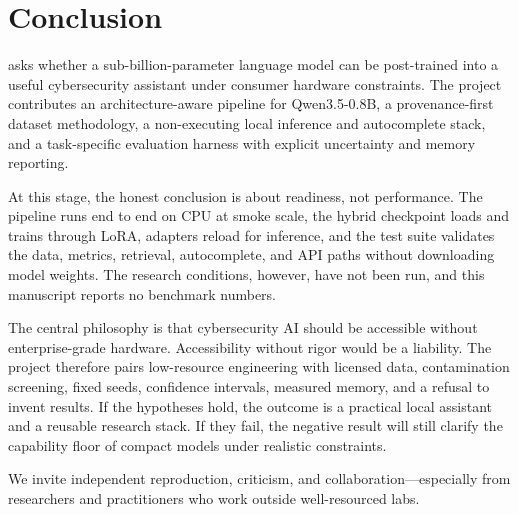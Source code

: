 \section{Conclusion}
\label{sec:conclusion}

\cyberlite{} asks whether a sub-billion-parameter language model can be
post-trained into a useful cybersecurity assistant under consumer hardware
constraints. The project contributes an architecture-aware pipeline for
Qwen3.5-0.8B, a provenance-first dataset methodology, a non-executing local
inference and autocomplete stack, and a task-specific evaluation harness with
explicit uncertainty and memory reporting.

At this stage, the honest conclusion is about readiness, not performance. The
pipeline runs end to end on CPU at smoke scale, the hybrid checkpoint loads and
trains through LoRA, adapters reload for inference, and the test suite validates
the data, metrics, retrieval, autocomplete, and API paths without downloading
model weights. The research conditions, however, have not been run, and this
manuscript reports no benchmark numbers.

The central philosophy is that cybersecurity AI should be accessible without
enterprise-grade hardware. Accessibility without rigor would be a liability.
The project therefore pairs low-resource engineering with licensed data,
contamination screening, fixed seeds, confidence intervals, measured memory, and
a refusal to invent results. If the hypotheses hold, the outcome is a practical
local assistant and a reusable research stack. If they fail, the negative result
will still clarify the capability floor of compact models under realistic
constraints.

We invite independent reproduction, criticism, and collaboration---especially
from researchers and practitioners who work outside well-resourced labs.
